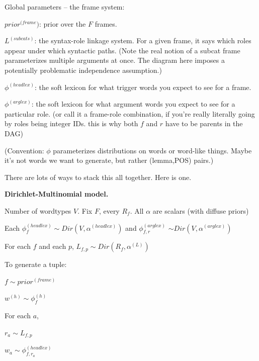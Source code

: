 \documentclass[11pt,letterpaper]{article}
\newenvironment{itemizesquish}{\begin{list}{\labelitemi}{\setlength{\itemsep}{0em}\setlength{\labelwidth}{0.5em}\setlength{\leftmargin}{\labelwidth}\addtolength{\leftmargin}{\labelsep}}}{\end{list}}
\begin{document}
Global parameters -- the frame system:

\begin{itemizesquish}
  \item $prior^{(frame})$: prior over the $F$ frames.
  \item $L^{(subcats)}$: the syntax-role linkage system.  For a given frame, it says which roles appear under which syntactic paths.  (Note the real notion of a subcat frame parameterizes multiple arguments at once.  The diagram here imposes a potentially problematic independence assumption.)
  \item $\phi^{(headlex)}$: the soft lexicon for what trigger words you expect to see for a frame.

  \item $\phi^{(arglex)}$: the soft lexicon for what argument words you expect to see for a particular role.  (or call it a frame-role combination, if you're really literally going by roles being integer IDs. this is why both $f$ and $r$ have to be parents in the DAG)
\end{itemizesquish}

(Convention: $\phi$ parameterizes distributions on words or word-like things.  
Maybe it's not words we want to generate, but rather (lemma,POS) pairs.)

There are lots of ways to stack this all together.  Here is one.

\textbf{Dirichlet-Multinomial model.}

Number of wordtypes $V$.  Fix $F$, every $R_f$.  All $\alpha$ are scalars (with diffuse priors)

\begin{itemizesquish}
  \item Each $\phi^{(headlex)}_f \sim Dir(V, \alpha^{(headlex)})$ and $\phi^{(arglex)}_{f,r}$ $\sim Dir(V, \alpha^{(arglex)})$
  \item For each $f$ and each $p$, $L_{f,p} \sim Dir(R_f, \alpha^{(L)})$
\end{itemizesquish}

To generate a tuple:

\begin{itemizesquish}
  \item $f \sim prior^{(frame)}$
  \item $w^{(h)} \sim \phi^{(h)}_f$
  \item For each $a$,
  \begin{itemizesquish}
    \item $r_a \sim L_{f,p}$
    \item $w_a \sim \phi^{(headlex)}_{f,r_a}$
  \end{itemizesquish}
\end{itemizesquish}
\end{document}
